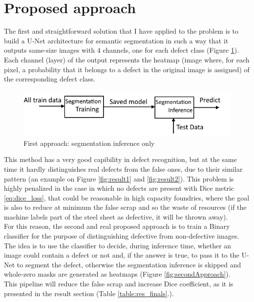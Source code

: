 \documentclass[10pt,twocolumn,letterpaper]{article}
\begin{document}
\section{Proposed approach}
   The first and straightforward solution that I have applied to the problem is to build a U-Net architecture for semantic segmentation in such a way that it outputs same-size images with 4 channels, one for each defect class (Figure \ref{fig:firstApproach}).  
   Each channel (layer) of the output represents the heatmap (image where, for each pixel, a probability that it belongs to a defect in the original image is assigned) of the corresponding defect class. 

   \begin{figure}[h]
      \centering
      \caption{First approach: segmentation inference only} \label{fig:firstApproach}
      \includegraphics[scale=0.55]{Img_FirstApproach}
   \end{figure}

   This method has a very good capibility in defect recognition, but at the same time it hardly distinguishes real defects from the false ones, due to their similar pattern (an example on Figure \ref{fig:result1} and \ref{fig:result2}). This problem is highly penalized in the case in which no defects are present with Dice metric \eqref{eq:dice_loss}, that could be reasonable in high capacity foundries, where the goal is also to reduce at minimum the false scrap and so the waste of resources (if the machine labels part of the steel sheet as defective, it will be thrown away).\\
   For this reason, the second and real proposed approach is to train a Binary classifier for the purpose of distinguishing defective from non-defective images. The idea is to use the classifier to decide, during inference time, whether an image could contain a defect or not and, if the answer is true, to pass it to the U-Net to segment the defect, otherwise the segmentation inference is skipped and whole-zero masks are generated as heatmaps (Figure \ref{fig:secondApproach}).\\
   This pipeline will reduce the false scrap and increase Dice coefficient, as it is presented in the result section (Table \ref{table:res_finals}.).
    
\end{document}
